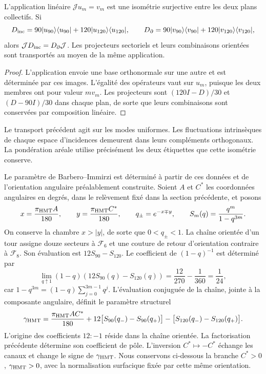 \begin{proposition}
\label{rev4:ae:colectivo}
L’application linéaire \(\mathcal J u_m=v_m\) est une isométrie
surjective entre les deux plans collectifs. Si
\[
 D_{\rm inc}=90|u_{90}\rangle\langle u_{90}|
             +120|u_{120}\rangle\langle u_{120}|,
 \qquad
 D_\partial=90|v_{90}\rangle\langle v_{90}|
             +120|v_{120}\rangle\langle v_{120}|,
\]
alors \(\mathcal J D_{\rm inc}=D_\partial\mathcal J\). Les projecteurs sectoriels et leurs combinaisons orientées sont transportés au moyen de la même application.
\end{proposition}
\begin{proof}
L’application envoie une base orthonormale sur une autre et est déterminée
par ces images. L’égalité des opérateurs vaut sur \(u_m\),
puisque les deux membres ont pour valeur \(m v_m\). Les projecteurs sont
\((120I-D)/30\) et \((D-90I)/30\) dans chaque plan, de sorte que
leurs combinaisons sont conservées par composition linéaire.
\end{proof}

Le transport précédent agit sur les modes uniformes. Les fluctuations
intrinsèques de chaque espace d’incidences demeurent dans leurs compléments
orthogonaux. La pondération aréale utilise précisément les deux étiquettes
que cette isométrie conserve.

Le paramètre de Barbero--Immirzi est déterminé à partir de ces données et de l'orientation angulaire préalablement construite. Soient \(A\) et \(C^*\) les coordonnées angulaires en degrés, dans le relèvement fixé dans la section précédente, et posons
\[
 x=\frac{\pi_{\rm HMT}A}{180},\qquad
 y=\frac{\pi_{\rm HMT}C^*}{180},\qquad
 q_\pm=e^{-x\mp y},\qquad
 S_m(q)=\frac{q^m}{1-q^{3m}}.
\]
On conserve la chambre \(x>|y|\), de sorte que \(0<q_\pm<1\).
La chaîne orientée d’un tour assigne douze secteurs à
\(\mathcal F_6\) et une couture de retour d’orientation contraire
à \(\mathcal F_8\). Son évaluation est \(12S_{90}-S_{120}\).
Le coefficient de \((1-q)^{-1}\) est déterminé par
\[
 \lim_{q\uparrow1}(1-q)(12S_{90}(q)-S_{120}(q))
 =\frac{12}{270}-\frac1{360}=\frac1{24},
\]
car \(1-q^{3m}=(1-q)\sum_{j=0}^{3m-1}q^j\).
L’évaluation conjuguée de la chaîne, jointe à la composante angulaire,
définit le paramètre structurel
\begin{equation}
 \gamma_{\rm HMT}
 =\frac{\pi_{\rm HMT}AC^*}{180}
 +12\bigl[S_{90}(q_-)-S_{90}(q_+)\bigr]
 -\bigl[S_{120}(q_-)-S_{120}(q_+)\bigr].
 \label{rev4:ae:gamma}
\end{equation}
L'origine des coefficients \(12:-1\) réside dans la chaîne orientée. La factorisation précédente détermine son coefficient de pôle. L'inversion \(C^*\mapsto-C^*\) échange les canaux et change le signe de \(\gamma_{\rm HMT}\). Nous conservons ci-dessous la branche \(C^*>0\), \(\gamma_{\rm HMT}>0\), avec la normalisation surfacique fixée par cette même orientation.

